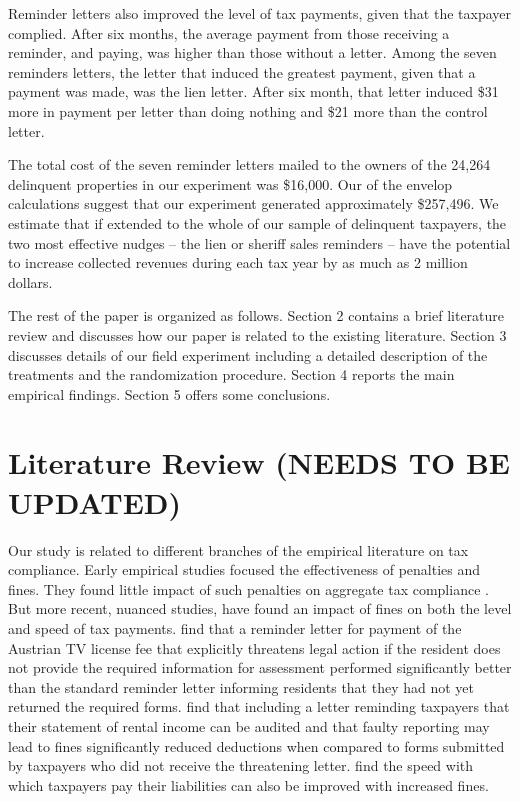 \documentclass[12pt]{article}
\begin{document}
Reminder letters also improved the level of tax payments, given that
the taxpayer complied. After six months, the average payment from those
receiving a reminder, and paying, was higher than those without a
letter.  Among the seven reminders letters, the letter that induced
the greatest payment, given that a payment was made, was the lien
letter.  After six month, that letter induced \$31 more in payment per letter
than doing nothing and \$21 more than the control letter.
  
The total cost of the seven reminder
letters mailed to the owners of the 24,264 delinquent properties in
our experiment was \$16,000.  Our of the envelop calculations suggest that our experiment 
generated approximately \$257,496. We estimate that if extended to the whole of our sample of delinquent
taxpayers, the two most effective nudges -- the lien or sheriff
sales reminders -- have the potential to increase collected revenues
during each tax year by as much as 2 million dollars. 

The rest of the paper is organized as follows. Section 2 contains a brief literature review and discusses
how our paper is related to the existing literature. Section 3 discusses details of our field experiment including a detailed description of the treatments and the randomization procedure. Section 4 reports the main empirical findings. Section 5 offers some conclusions.
  

  

\section{Literature Review (NEEDS TO BE UPDATED)}

Our study is related to different branches of the empirical literature on 
tax compliance. Early
empirical studies focused the effectiveness of penalties and fines. They found little impact of such penalties on aggregate
tax compliance .  But more recent, nuanced
studies, have found an impact of fines on both the level and speed of
tax payments.   find that a reminder letter for
payment of the Austrian TV license fee that explicitly threatens legal
action if the resident does not provide the required information for
assessment performed significantly better than the standard reminder
letter informing residents that they had not yet returned the required
forms.   find that including a letter
reminding taxpayers that their statement of rental income can be
audited and that faulty reporting may lead to fines significantly
reduced deductions when compared to forms submitted by taxpayers who
did not receive the threatening letter.  
find the speed with which taxpayers pay their liabilities can also be
improved with increased fines.
\end{document}

